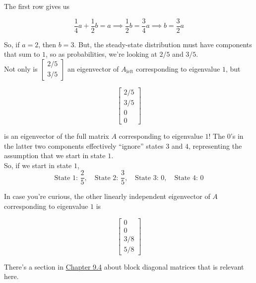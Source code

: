 \documentclass[11pt]{article}
\begin{document}
\begin{prob}[(14 pts)]
\begin{subprob}
\begin{solution}
The first row gives us

$$\frac{1}{4}a + \frac{1}{2} b = a \implies \frac{1}{2} b = \frac{3}{4}a \implies b = \frac{3}{2}a$$

So, if $a = 2$, then $b = 3$. But, the steady-state distribution must have components that sum to $1$, so as probabilities, we're looking at $2/5$ and $3/5$. \\

Not only is $\begin{bmatrix} 2/5 \\ 3/5 \end{bmatrix}$ an eigenvector of $A_{\text{left}}$ corresponding to eigenvalue $1$, but

$$\begin{bmatrix} 2/5 \\ 3/5 \\ 0 \\ 0 \end{bmatrix}$$

is an eigenvector of the full matrix $A$ corresponding to eigenvalue $1$! The 0's in the latter two components effectively ``ignore'' states $3$ and $4$, representing the assumption that we start in state $1$. \\

So, if we start in state $1$,
\[
\boxed{\text{State 1: } \frac{2}{5},\quad \text{State 2: } \frac{3}{5},\quad \text{State 3: } 0,\quad \text{State 4: } 0}
\]

In case you're curious, the other linearly independent eigenvector of $A$ corresponding to eigenvalue $1$ is

$$\begin{bmatrix} 0 \\ 0 \\ 3/8 \\ 5/8 \end{bmatrix}$$

There's a section in \href{https://notes.eecs245.org/eigenvalues-and-eigenvectors/multiplicities-diagonalization/\#example-another-diagonalizable-matrix}{Chapter 9.4} about block diagonal matrices that is relevant here.

\end{solution}
\end{subprob}




\end{prob}
\end{document}
